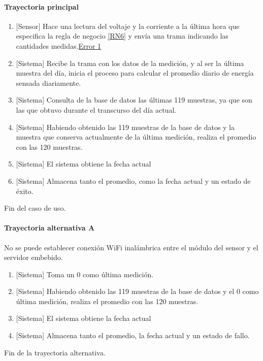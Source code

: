 \paragraph{Trayectoria principal}
	\begin{enumerate}
		\item {[Sensor]} Hace una lectura del voltaje y la corriente a la última hora que especifica la regla de negocio \ref{RN6} y envía una trama indicando las cantidades medidas.\hyperref[SUB-M-CU1:Error1]{Error 1}
		\item {[Sistema]} Recibe la trama con los datos de la medición, y al ser la última muestra del día, inicia el proceso para calcular el promedio diario de energía sensada diariamente.
		\item  {[Sistema]} Consulta de la base de datos las últimas 119 muestras, ya que son las que obtuvo durante el transcurso del día actual.
		\item {[Sistema]} Habiendo obtenido las 119 muestras de la base de datos y la muestra que conserva actualmente de la última medición, realiza el promedio con las 120 muestras.
		\item {[Sistema]} El sistema obtiene la fecha actual
		\item {[Sistema]} Almacena tanto el promedio, como la fecha actual y un estado de éxito.
	\end{enumerate}
	Fin del caso de uso.

\paragraph{Trayectoria alternativa A} \label{SUB-M-CU1:TA}
	No se puede establecer conexión WiFi inalámbrica entre el módulo del sensor y el servidor embebido.
	\begin{enumerate}[label=A\arabic*.]
		\item {[Sistema]} Toma un 0 como última medición. 
		\item {[Sistema]} Habiendo obtenido las 119 muestras de la base de datos y el 0 como última medición, realiza el promedio con las 120 muestras.
		\item {[Sistema]} El sistema obtiene la fecha actual
		\item {[Sistema]} Almacena tanto el promedio, la fecha actual y un estado de fallo.
	\end{enumerate}
	Fin de la trayectoria alternativa.
